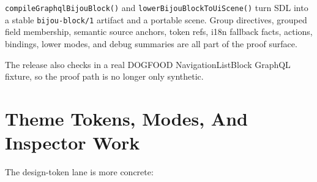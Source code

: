 \texttt{c\allowbreak{}o\allowbreak{}m\allowbreak{}p\allowbreak{}i\allowbreak{}l\allowbreak{}e\allowbreak{}G\allowbreak{}r\allowbreak{}a\allowbreak{}p\allowbreak{}h\allowbreak{}q\allowbreak{}l\allowbreak{}B\allowbreak{}i\allowbreak{}j\allowbreak{}o\allowbreak{}u\allowbreak{}B\allowbreak{}l\allowbreak{}o\allowbreak{}c\allowbreak{}k\allowbreak{}(\allowbreak{})} and \texttt{l\allowbreak{}o\allowbreak{}w\allowbreak{}e\allowbreak{}r\allowbreak{}B\allowbreak{}i\allowbreak{}j\allowbreak{}o\allowbreak{}u\allowbreak{}B\allowbreak{}l\allowbreak{}o\allowbreak{}c\allowbreak{}k\allowbreak{}T\allowbreak{}o\allowbreak{}U\allowbreak{}i\allowbreak{}S\allowbreak{}c\allowbreak{}e\allowbreak{}n\allowbreak{}e\allowbreak{}(\allowbreak{})} turn SDL into a stable \texttt{b\allowbreak{}i\allowbreak{}j\allowbreak{}o\allowbreak{}u\allowbreak{}-\allowbreak{}b\allowbreak{}l\allowbreak{}o\allowbreak{}c\allowbreak{}k\allowbreak{}/\allowbreak{}1} artifact and a portable scene. Group directives, grouped field membership, semantic source anchors, token refs, i18n fallback facts, actions, bindings, lower modes, and debug summaries are all part of the proof surface.

The release also checks in a real DOGFOOD NavigationListBlock GraphQL fixture, so the proof path is no longer only synthetic.

\section{Theme Tokens, Modes, And Inspector Work}\label{record-282-theme-tokens-modes-and-inspector-work}

The design-token lane is more concrete:

